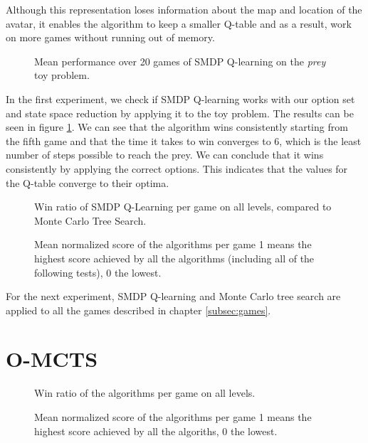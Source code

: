 Although this representation loses information about the map and location
of the avatar, it enables the algorithm to keep a smaller Q-table and as a
result, work on more games without running out of memory.

\begin{figure}
	\centering
	\caption{Mean performance over 20 games of SMDP Q-learning on the
	\textit{prey} toy problem.}
	\label{fig:qlearning}
\end{figure}

In the first experiment, we check if SMDP Q-learning works with our option set
and state space reduction by applying it to the toy problem. The results can be
seen in figure \ref{fig:qlearning}. We can see that the algorithm wins
consistently starting from the fifth game and that the time it takes to win
converges to 6, which is the least number of steps possible to reach the prey.
We can conclude that it wins consistently by applying the correct options. This
indicates that the values for the Q-table converge to their optima.

\begin{figure}
	\centering
	\vspace{-.8cm}
	\caption{Win ratio of SMDP Q-Learning per game on all levels, compared to Monte Carlo Tree Search.}
	\label{fig:wins}
	\centering
	\vspace{-.8cm}
	\caption{Mean normalized score of the algorithms per game 1 means the
	highest score achieved by all the algorithms (including all of the following
tests), 0 the lowest.}
	\label{fig:scores}
\end{figure}

For the next experiment, SMDP Q-learning and Monte Carlo tree search are applied
to all the games described in chapter \ref{subsec:games}. 

\section{O-MCTS}
\label{subsec:omcts}
\begin{figure}
	\centering
	\vspace{-.8cm}
	\caption{Win ratio of the algorithms per game on all levels.}
	\label{fig:wins}
	\centering
	\vspace{-.8cm}
	\caption{Mean normalized score of the algorithms per game 1 means the
	highest score achieved by all the algoriths, 0 the lowest.}
	\label{fig:scores}
\end{figure}

